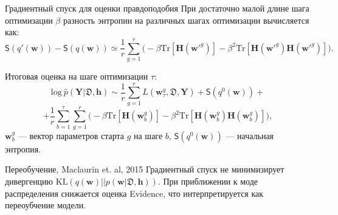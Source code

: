 \documentclass[usenames,dvipsnames,10pt,pdf,utf8,russian,aspectratio=43]{beamer}
\begin{document}
\begin{frame}{Градиентный спуск для оценки правдоподобия}
При достаточно малой длине шага оптимизации $\beta$ разность энтропии на различных шагах оптимизации вычисляется как:
\[
\mathsf{S}(q'(\mathbf{w})) -  \mathsf{S}(q(\mathbf{w}))  \simeq  \frac{1}{r}\sum_{g=1}^r \bigl(-\beta \text{Tr}[\mathbf{H}(\mathbf{w}'^g)] - \beta^2 \text{Tr}[\mathbf{H}(\mathbf{w}'^g)\mathbf{H}(\mathbf{w}'^g)]  \bigr).
\]

Итоговая оценка на шаге оптимизации $\tau$:
$$
\text{log}~\hat{p}(\mathbf{Y}|\mathfrak{D}, \mathbf{h}) \sim \frac{1}{r} \sum_{g = 1}^r L(\mathbf{w}^g_\tau, \mathfrak{D}, \mathbf{Y})  + \mathsf{S}(q^0(\mathbf{w}))+$$ $$ + \frac{1}{r}\sum_{b=1}^\tau\sum_{g=1}^r \bigl(-\beta \text{Tr}[\mathbf{H}(\mathbf{w}_b^g)] - \beta^2 \text{Tr}[\mathbf{H}(\mathbf{w}_b^g)\mathbf{H}(\mathbf{w}_b^g)]  \bigr),
$$
$\mathbf{w}_b^g$ --- вектор параметров старта $g$ на шаге $b$, $\mathsf{S}(q^0(\mathbf{w}))$ --- начальная энтропия.
\end{frame}
\begin{frame}{Переобучение,  Maclaurin et. al, 2015}
Градиентный спуск не минимизирует дивергенцию $\text{KL}(q(\mathbf{w})||p(\mathbf{w}| \mathfrak{D}, \mathbf{h}))$. При приближении к моде распределения снижается оценка Evidence, что интерпретируется как переоубчение модели.

\begin{figure}
  \centering
\label{fig:1}\qquad
\end{figure}
\end{frame}
\end{document}
